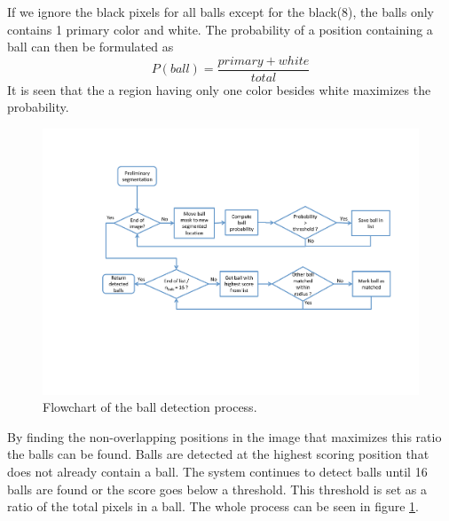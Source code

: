 If we ignore the black pixels for all balls except for the black(8), the balls only contains 1 primary color and white. The probability of a position containing a ball can then be formulated as
\begin{equation}
P(ball) = \frac{primary + white}{total}
\end{equation}
It is seen that the a region having only one color besides white maximizes the probability.
\begin{figure}[h]
\begin{center}
\includegraphics[width=\textwidth]{images/ballflowchart.pdf}
\caption{Flowchart of the ball detection process.}
\label{fig:ballflowchart}
\end{center}
\end{figure}
By finding the non-overlapping positions in the image that maximizes this ratio the balls can be found. Balls are detected at the highest scoring position that does not already contain a ball. The system continues to detect balls until 16 balls are found or the score goes below a threshold. This threshold is set as a ratio of the total pixels in a ball. The whole process can be seen in figure \ref{fig:ballflowchart}.

